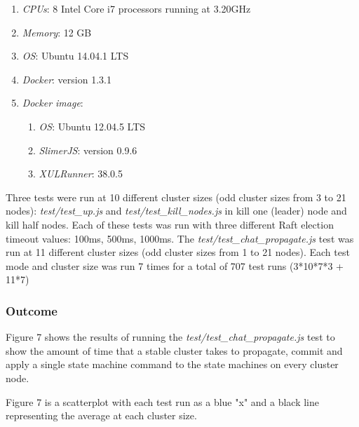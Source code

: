 \documentclass[9pt]{extarticle}
\begin{document}
\begin{multicols}{2}
\begin{enumerate}
    \item \emph{CPUs}: 8 Intel Core i7 processors running at 3.20GHz
    \item \emph{Memory}: 12 GB
    \item \emph{OS}: Ubuntu 14.04.1 LTS
    \item \emph{Docker}: version 1.3.1
    \item \emph{Docker image}:
    \begin{enumerate}
        \item \emph{OS}: Ubuntu 12.04.5 LTS
        \item \emph{SlimerJS}: version 0.9.6
        \item \emph{XULRunner}: 38.0.5
    \end{enumerate}
\end{enumerate}

Three tests were run at 10 different cluster sizes (odd cluster sizes
from 3 to 21 nodes): \emph{test/test\_up.js} and
\emph{test/test\_kill\_nodes.js} in kill one (leader) node and kill
half nodes. Each of these tests was run with three different Raft election
timeout values: 100ms, 500ms, 1000ms. The
\emph{test/test\_chat\_propagate.js} test was run at
11 different cluster sizes (odd cluster sizes from 1 to 21 nodes).
Each test mode and cluster size was run 7 times for a total of 707
test runs (3*10*7*3 + 11*7)

\subsubsection{Outcome}

Figure 7 shows the results of running the
\emph{test/test\_chat\_propagate.js} test to show the amount of time
that a stable cluster takes to propagate, commit and apply a single
state machine command to the state machines on every cluster node.

Figure 7 is a scatterplot with each test run as a blue "x" and a black
line representing the average at each cluster size.

\begin{center}
\label{fig:propagate}
\end{center}


\end{multicols}
\end{document}
